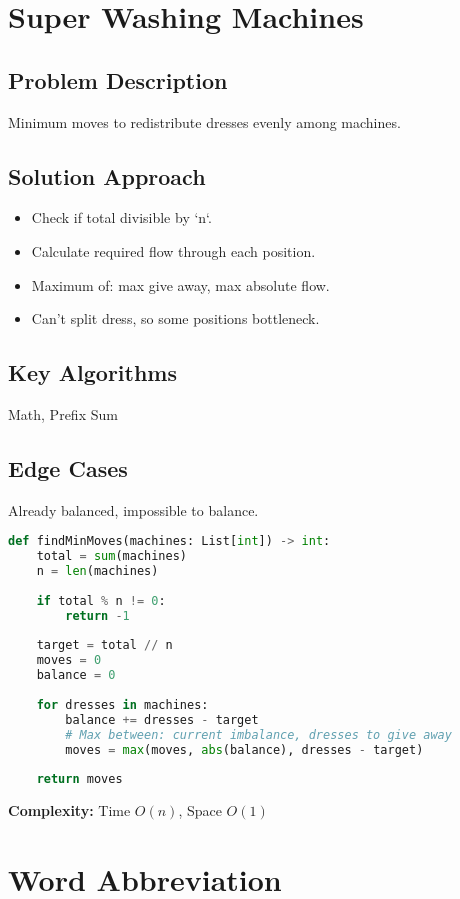 \documentclass[10pt, a4paper]{article}
\begin{document}
\section{Super Washing Machines}
\subsection*{Problem Description}
Minimum moves to redistribute dresses evenly among machines.

\subsection*{Solution Approach}
\begin{itemize}
    \item Check if total divisible by `n`.
    \item Calculate required flow through each position.
    \item Maximum of: max give away, max absolute flow.
    \item Can't split dress, so some positions bottleneck.
\end{itemize}

\subsection*{Key Algorithms}
Math, Prefix Sum

\subsection*{Edge Cases}
Already balanced, impossible to balance.

\begin{lstlisting}[language=Python]
def findMinMoves(machines: List[int]) -> int:
    total = sum(machines)
    n = len(machines)
    
    if total % n != 0:
        return -1
    
    target = total // n
    moves = 0
    balance = 0
    
    for dresses in machines:
        balance += dresses - target
        # Max between: current imbalance, dresses to give away
        moves = max(moves, abs(balance), dresses - target)
    
    return moves
\end{lstlisting}
\textbf{Complexity:} Time $O(n)$, Space $O(1)$

\section{Word Abbreviation}
\end{document}
